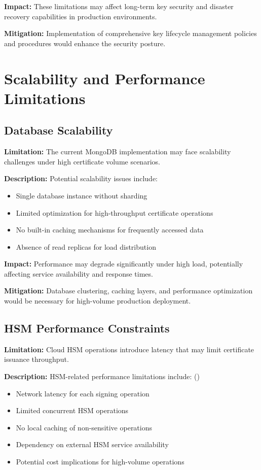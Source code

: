 \textbf{Impact:} These limitations may affect long-term key security and disaster recovery capabilities in production environments.

\textbf{Mitigation:} Implementation of comprehensive key lifecycle management policies and procedures would enhance the security posture.

\section{Scalability and Performance Limitations}

\subsection{Database Scalability}

\textbf{Limitation:} The current MongoDB implementation may face scalability challenges under high certificate volume scenarios.

\textbf{Description:} Potential scalability issues include:
\begin{itemize}
    \item Single database instance without sharding
    \item Limited optimization for high-throughput certificate operations
    \item No built-in caching mechanisms for frequently accessed data
    \item Absence of read replicas for load distribution
\end{itemize}

\textbf{Impact:} Performance may degrade significantly under high load, potentially affecting service availability and response times.

\textbf{Mitigation:} Database clustering, caching layers, and performance optimization would be necessary for high-volume production deployment.

\subsection{HSM Performance Constraints}

\textbf{Limitation:} Cloud HSM operations introduce latency that may limit certificate issuance throughput.

\textbf{Description:} HSM-related performance limitations include: ({\color{red}{TODO: Check}})
\begin{itemize}
    \item Network latency for each signing operation
    \item Limited concurrent HSM operations
    \item No local caching of non-sensitive operations
    \item Dependency on external HSM service availability
    \item Potential cost implications for high-volume operations
\end{itemize}

